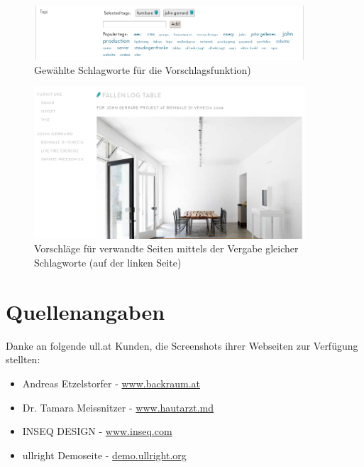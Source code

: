 \documentclass[article, a4paper, oneside, 11pt]{memoir}
\begin{document}
\begin{figure}[htp]
\centering
\includegraphics[width=0.9\textwidth]{tagging}
\caption{Gewählte Schlagworte für die Vorschlagsfunktion)}
\label{fig:tagging2}
\end{figure}

\begin{figure}[htp]
\centering
\includegraphics[width=0.9\textwidth]{recommendation}
\caption{Vorschläge für verwandte Seiten mittels der Vergabe gleicher Schlagworte (auf der linken Seite)}
\label{fig:recommendation}
\end{figure}



\section{Quellenangaben}

Danke an folgende ull.at Kunden, die Screenshots ihrer Webseiten zur Verfügung stellten:

\begin{itemize}
\item Andreas Etzelstorfer - \href{http://www.backraum.at}{www.backraum.at}
\item Dr. Tamara Meissnitzer - \href{http://www.hautarzt.md}{www.hautarzt.md}
\item INSEQ DESIGN - \href{http://www.inseq.com}{www.inseq.com}
\item ullright Demoseite - \href{http://demo.ullright.org}{demo.ullright.org}
\end{itemize}
\end{document}
